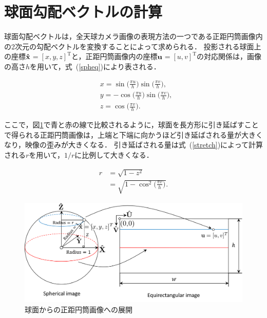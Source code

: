 \clearpage
\section{球面勾配ベクトルの計算}

球面勾配ベクトルは，全天球カメラ画像の表現方法の一つである正距円筒画像内の2次元の勾配ベクトルを変換することによって求められる．
投影される球面上の座標$\bf{\hat{x}}$$=[x,y,z]^{\mathrm{T}}$と，正距円筒画像内の座標$\bf{u}$$=[u,v]^{\mathrm{T}}$の対応関係は，画像の高さ$h$を用いて，式~(\ref{spheq})により表される．

\begin{equation}
\begin{aligned}
& x=\sin\big(\frac{\pi u}{h}\big)\sin\big(\frac{\pi v}{h}\big), \\[2.5pt]
& y=-\cos\big(\frac{\pi u}{h}\big)\sin\big(\frac{\pi v}{h}\big), \\[2.5pt]
& z=\cos\big(\frac{\pi v}{h}\big).
\end{aligned}
\label{spheq}
\end{equation}

ここで，図\ref{fig:stretch}で青と赤の線で比較されるように，球面を長方形に引き延ばすことで得られる正距円筒画像は，上端と下端に向かうほど引き延ばされる量が大きくなり，映像の歪みが大きくなる．
引き延ばされる量は式~(\ref{stretch})によって計算される$r$を用いて，$1/r$に比例して大きくなる．

\begin{equation}
\begin{aligned}
 r & =\sqrt{1-z^2} \\[2pt]
   & = \sqrt{1-\cos^2\big(\frac{\pi v}{h}\big)}.
\end{aligned}
\label{stretch}
\end{equation}

\begin{figure}[b]
 \begin{center}
 \includegraphics[width=0.9\columnwidth]{./chap3/fig/stretch.png}
 \vspace{3mm}
 \caption{球面からの正距円筒画像への展開}
 \label{fig:stretch}
 \end{center}
\end{figure}

